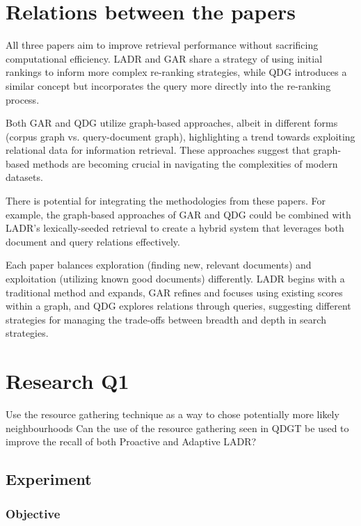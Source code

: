 \documentclass[sigconf,authorversion,nonacm]{acmart}
\begin{document}
\section{Relations between the papers}

All three papers aim to improve retrieval performance without sacrificing computational efficiency.
LADR and GAR share a strategy of using initial rankings to inform more complex re-ranking
strategies, while QDG introduces a similar concept but incorporates the query more directly into the
re-ranking process.

Both GAR and QDG utilize graph-based approaches, albeit in different forms (corpus graph vs.
query-document graph), highlighting a trend towards exploiting relational data for information
retrieval. These approaches suggest that graph-based methods are becoming crucial in navigating the
complexities of modern datasets.

There is potential for integrating the methodologies from these papers. For example, the graph-based
approaches of GAR and QDG could be combined with LADR's lexically-seeded retrieval to create a
hybrid system that leverages both document and query relations effectively.

Each paper balances exploration (finding new, relevant documents) and exploitation (utilizing known
good documents) differently. LADR begins with a traditional method and expands, GAR refines and
focuses using existing scores within a graph, and QDG explores relations through queries, suggesting
different strategies for managing the trade-offs between breadth and depth in search strategies.

\section{Research Q1}

Use the resource gathering technique as a way to chose potentially more likely neighbourhoods
Can the use of the resource gathering seen in QDGT\cite{query-document} be used to improve the recall
of both Proactive and Adaptive LADR?

\subsection{Experiment}

\subsubsection{Objective}
\end{document}
